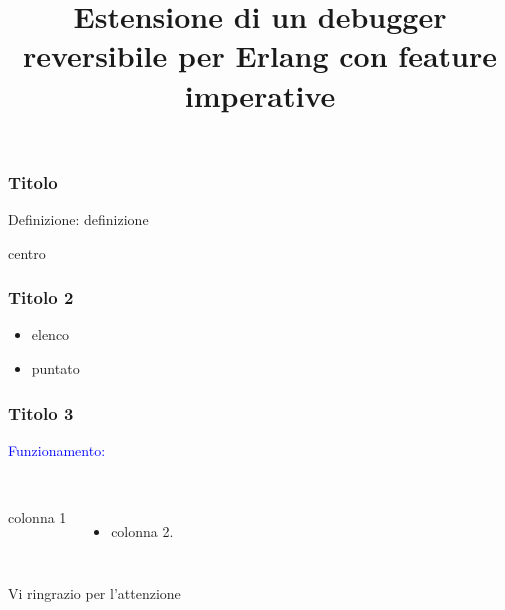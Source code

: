 \documentclass{beamer}
\title[]{Estensione di un debugger reversibile per Erlang con feature imperative} %
\author{} %
\institute[UniBo] %
{
Universit\`{a} di Bologna \\ %
\medskip \medskip
SCUOLA DI SCIENZE\\
Corso di Laurea Magistrale in Informatica\\
\medskip \medskip
Relatore: \quad  Prof. Claudio Sacerdoti Coen \\ 
Presentata da: \qquad \qquad \qquad Pietro Lami\\
\medskip \medskip
II Sessione\\
Anno Accademico 2019-2020
}
\date{} %
\begin{document}
\begin{frame}
\titlepage %

\end{frame}





\begin{frame}
\frametitle{Titolo}
\begin{block}{Definizione:}
 definizione
\begin{center}centro\end{center}
\end{block}

\end{frame}



\begin{frame}
\frametitle{Titolo 2}



\begin{itemize}
\item elenco   
\item puntato
\end{itemize}
\end{frame}



\begin{frame}
\frametitle{Titolo 3}
 \textcolor{blue}{Funzionamento:}\\~
\begin{columns}[c]
colonna 1 
\begin{itemize}
\item colonna 2.
\end{itemize}
\end{columns}
\end{frame}


\begin{frame}
\Huge{\centerline{Vi ringrazio per l'attenzione}}
\end{frame}

\end{document}
